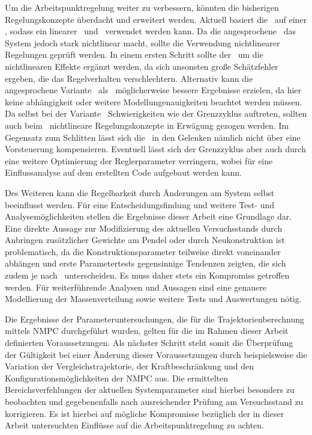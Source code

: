 Um die Arbeitspunktregelung weiter zu verbessern, könnten die bisherigen Regelungskonzepte überdacht und erweitert werden.
Aktuell basiert die \aprg\ auf einer \lin, sodass ein linearer \zsr\ und \beob\ verwendet werden kann.
Da die angesprochene \crb\ das System jedoch stark nichtlinear macht, sollte die Verwendung nichtlinearer Regelungen geprüft werden.
In einem ersten Schritt sollte der \beob\ um die nichtlinearen Effekte ergänzt werden, da sich ansonsten große Schätzfehler ergeben, die das Regelverhalten verschlechtern.
Alternativ kann die angesprochene Variante \diff\ als \ze\ möglicherweise bessere Ergebnisse erzielen, da hier keine \ap abhängigkeit oder weitere Modellungenauigkeiten beachtet werden müssen.
Da selbst bei der Variante \zm\ Schwierigkeiten wie der Grenzzyklus auftreten, sollten auch beim \zsr\ nichtlineare Regelungskonzepte in Erwägung gezogen werden.
Im Gegensatz zum Schlitten lässt sich die \crb\ in den Gelenken nämlich nicht über eine Vorsteuerung kompensieren.
Eventuell lässt sich der Grenzzyklus aber auch durch eine weitere Optimierung der Reglerparameter verringern, wobei für eine Einflussanalyse auf dem erstellten Code aufgebaut werden kann.

Des Weiteren kann die Regelbarkeit durch Änderungen am System selbst beeinflusst werden.
Für eine Entscheidungsfindung und weitere Test- und Analysemöglichkeiten stellen die Ergebnisse dieser Arbeit eine Grundlage dar.
Eine direkte Aussage zur Modifizierung des aktuellen Versuchsstands durch Anbringen zusätzlicher Gewichte am Pendel oder durch Neukonstruktion  ist problematisch, da die Konstruktionsparameter teilweise direkt voneinander abhängen und erste Parametertests gegensinnige Tendenzen zeigten, die sich zudem je nach \ap\ unterscheiden.
Es muss daher stets ein Kompromiss getroffen werden.
Für weiterführende Analysen und Aussagen sind eine genauere Modellierung der Massenverteilung sowie weitere Tests und Auswertungen nötig.

Die Ergebnisse der Parameteruntersuchungen, die für die Trajektorienberechnung mittels NMPC durchgeführt wurden, gelten für die im Rahmen dieser Arbeit definierten Voraussetzungen. %
Als nächster Schritt steht somit die Überprüfung der Gültigkeit bei einer Änderung dieser Voraussetzungen durch beispielsweise die Variation der Vergleichstrajektorie, der Kraftbeschränkung und den Konfigurationsmöglichkeiten der NMPC aus. Die ermittelten Bereichsverfehlungen der aktuellen Systemparameter sind hierbei besonders zu beobachten und gegebenenfalls nach ausreichender Prüfung am Versuchsstand zu korrigieren. Es ist hierbei auf mögliche Kompromisse bezüglich der in dieser Arbeit untersuchten Einflüsse auf die Arbeitspunktregelung zu achten.

